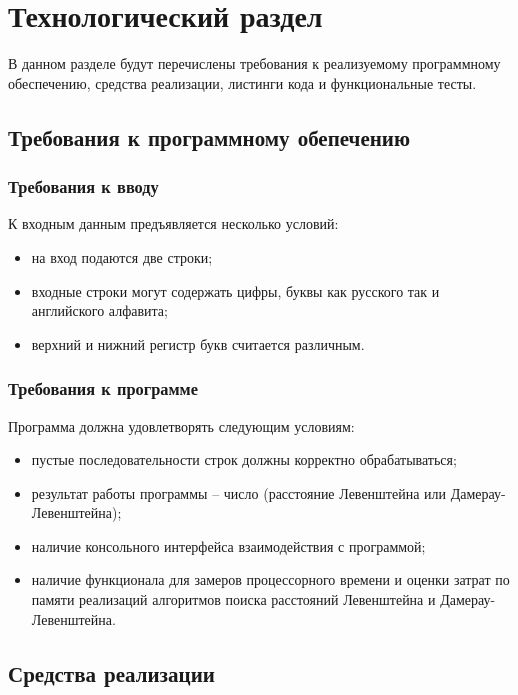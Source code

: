 \chapter{Технологический раздел}

В данном разделе будут перечислены требования к реализуемому программному обеспечению, средства реализации, листинги кода и функциональные тесты.

\section{Требования к программному обепечению}

\subsection{Требования к вводу}

К входным данным предъявляется несколько условий:

\begin{itemize}[label=--]
	\item на вход подаются две строки;
	\item входные строки могут содержать цифры, буквы как русского так и английского алфавита;
	\item верхний и нижний регистр букв считается различным.
\end{itemize}

\subsection{Требования к программе}

Программа должна удовлетворять следующим условиям: 

\begin{itemize}[label=--]
	\item пустые последовательности строк должны корректно обрабатываться;
	\item результат работы программы -- число (расстояние Левенштейна или Дамерау-Левенштейна);
	\item наличие консольного интерфейса взаимодействия с программой;
	\item наличие функционала для замеров процессорного времени и оценки затрат по памяти реализаций алгоритмов поиска расстояний Левенштейна и Дамерау-Левенштейна.
\end{itemize}

\section{Средства реализации}

